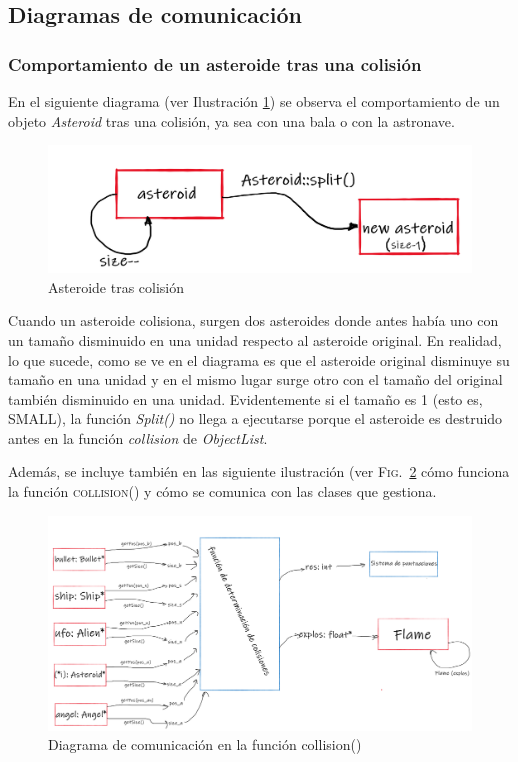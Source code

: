 \subsection{Diagramas de comunicación}
\subsubsection{Comportamiento de un asteroide tras una colisión}
En el siguiente diagrama (ver Ilustración \ref{asteroid}) se observa el comportamiento de un objeto \emph{Asteroid} tras una colisión, ya sea con una bala o con la astronave.

\begin{figure}[H]
    \centering
    \includegraphics[width=\textwidth]{fotos/asteroid.png}
    \caption{Asteroide tras colisión}
    \label{asteroid}
\end{figure}

Cuando un asteroide colisiona, surgen dos asteroides donde antes había uno con un tamaño disminuido en una unidad respecto al asteroide original. En realidad, lo que sucede, como se ve en el diagrama es que el asteroide original disminuye su tamaño en una unidad y en el mismo lugar surge otro con el tamaño del original también disminuido en una unidad. Evidentemente si el tamaño es 1 (esto es, SMALL), la función \emph{Split()} no llega a ejecutarse porque el asteroide es destruido antes en la función \emph{collision} de \emph{ObjectList}.

Además, se incluye también en las siguiente ilustración (ver \textsc{Fig.}~\ref{collisions} cómo funciona la función \textsc{collision()} y cómo se comunica con las clases que gestiona.

\begin{figure}[H]
    \centering
    \includegraphics[width=\textwidth]{fotos/Collision.png}
    \caption{Diagrama de comunicación en la función collision()}
    \label{collisions}
\end{figure}

\clearpage